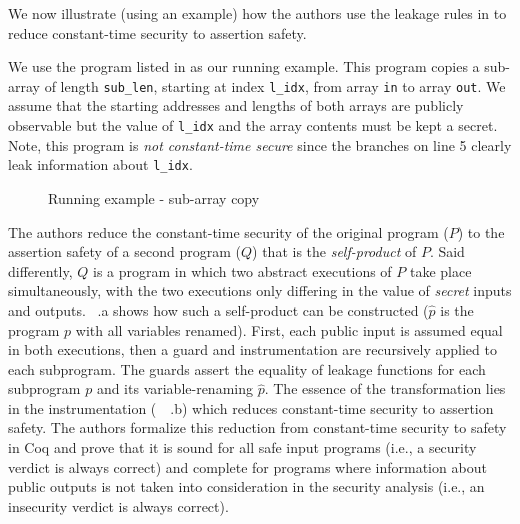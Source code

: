 
We now illustrate (using an example) how the authors use the leakage rules in  
to reduce constant-time security to assertion safety.

We use the program listed in  as our running example. 
This program copies a sub-array of length \texttt{sub\_len}, starting at index \texttt{l\_idx}, from array \texttt{in}
to array \texttt{out}.
We assume that the starting addresses and lengths of both arrays are publicly observable but the value of \texttt{l\_idx} and the array contents must be kept a secret.
Note, this program is \emph{not constant-time secure} since the branches on line 5 clearly leak information about \texttt{l\_idx}.

\begin{figure}[h]
    \centering\resizebox{0.7\columnwidth}{!}{}
    \caption{Running example - sub-array copy}
    \label{fig:example}
\end{figure}


The authors reduce the constant-time security of the original program ($P$) to the assertion safety of a second program ($Q$) that is the \emph{self-product} of $P$.
Said differently, $Q$ is a program in which two abstract executions of $P$ take place simultaneously, with the two executions only differing in the value of \emph{secret} inputs and outputs. 
~.a shows how such a self-product can be constructed ($\hat{p}$ is the program $p$ with all variables renamed).
First, each public input is assumed equal in both executions, then a guard and instrumentation are recursively applied to each subprogram. 
The guards assert the equality of leakage functions for each subprogram $p$ and its variable-renaming $\hat{p}$.
The essence of the transformation lies in the instrumentation (~~.b) which reduces constant-time security to assertion safety. 
The authors formalize this reduction from constant-time security to safety in Coq and prove that it is sound for all safe input programs (i.e., a security verdict is always correct) and complete for programs where information about public outputs is not taken into consideration in the security analysis (i.e., an insecurity verdict is always correct).

